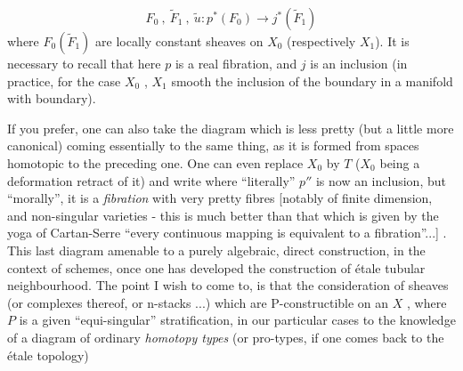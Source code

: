 \[ F_0 \ , \ \widetilde{F}_1 \ , \ \widetilde{u} : p^*(F_0) \to j^*(\widetilde{F}_1) \]
where $F_0(\widetilde{F}_1)$ are locally constant sheaves on $X_0$ (respectively $X_1$).
It is necessary to recall that  here $p$ is a real fibration, and
$j$ is an inclusion (in practice, for the case $X_0$ , $X_1$ smooth\hand{,} the
inclusion of the boundary in a manifold with boundary).

If you prefer, one can also take the diagram which is less pretty (but
a little more canonical)
coming essentially to the same thing, as it is formed from spaces homotopic
to the preceding one. One can even replace $X_0$ by $T$ ($X_0$ being a
deformation retract of it) and write
where ``literally'' $p''$ is now an inclusion, but ``morally'', it is a \textit{fibration}
with  very pretty fibres [notably  of finite dimension, and  
non-singular varieties - this is  much better than that which is given
by the yoga of Cartan-Serre ``every continuous mapping is equivalent to a
fibration''...] . This last diagram   amenable to a purely algebraic, direct
construction, in the context of schemes, once one has developed the
construction of étale tubular neighbourhood.
 The point I wish to come to, is that the consideration of sheaves
(or complexes thereof, or n-stacks ...) which are P-constructible on an $X$ ,
where $P$ is a given ``equi-singular'' stratification,   in our particular
cases to the knowledge of a diagram of ordinary \textit{homotopy types} (or pro-types,
if one comes back to the étale topology)

